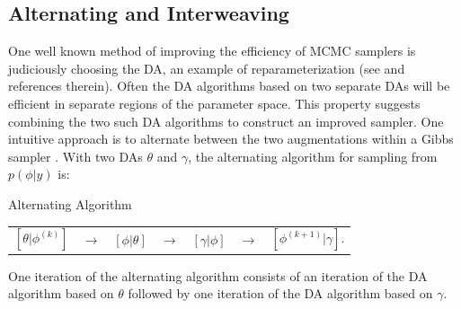 \documentclass[12pt]{article}
\begin{document}
\subsection{Alternating and Interweaving}
One well known method of improving the efficiency of MCMC samplers is judiciously choosing the DA, an example of reparameterization (see  \citet{papaspiliopoulos2007general} and references therein). Often the DA algorithms based on two separate DAs will be efficient in separate regions of the parameter space. This property suggests combining the two such DA algorithms to construct an improved sampler. One intuitive approach is to alternate between the two augmentations within a Gibbs sampler \citep{papaspiliopoulos2007general}. With two DAs $\theta$ and $\gamma$, the alternating algorithm for sampling from $p(\phi|y)$ is:
\begin{alg*}[Alt]Alternating Algorithm\label{alg:Alt}
{\small \vspace{-.5cm}
  \begin{center}
    \begin{tabular}{lllllll}
  $[\theta|\phi^{(k)}]$& $\to$& $[\phi|\theta]$& $\to$& $[\gamma|\phi]$& $\to$& $[\phi^{(k+1)}|\gamma]$.
    \end{tabular}
  \end{center}
}
\end{alg*}
\noindent One iteration of the alternating algorithm consists of an iteration of the DA algorithm based on $\theta$ followed by one iteration of the DA algorithm based on $\gamma$. 
\end{document}
